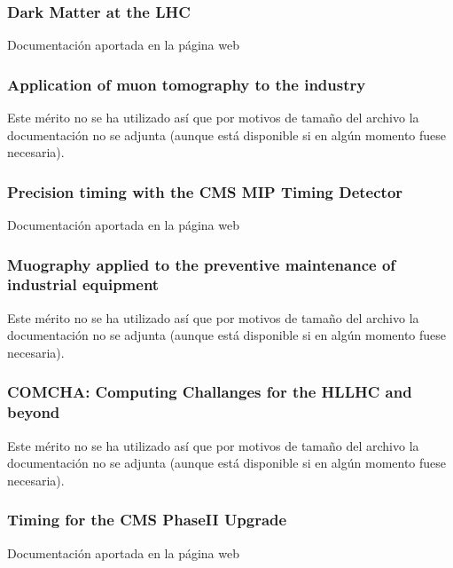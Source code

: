 \documentclass[a4paper, 11pt, twoside, openright]{report}
\begin{document}
\subsubsection{Dark Matter at the LHC}
%
Documentación aportada en la página web

\subsubsection{Application of muon tomography to the industry}
%
Este mérito no se ha utilizado así que por motivos de tamaño del archivo la documentación no se adjunta (aunque está disponible si en algún momento fuese necesaria).


\subsubsection{Precision timing with the CMS MIP Timing Detector}
%
Documentación aportada en la página web

\subsubsection{Muography applied to the preventive maintenance of industrial equipment}
%
Este mérito no se ha utilizado así que por motivos de tamaño del archivo la documentación no se adjunta (aunque está disponible si en algún momento fuese necesaria).

\subsubsection{COMCHA: Computing Challanges for the HLLHC and beyond}
%
Este mérito no se ha utilizado así que por motivos de tamaño del archivo la documentación no se adjunta (aunque está disponible si en algún momento fuese necesaria).


\subsubsection{Timing for the CMS PhaseII Upgrade}
%
Documentación aportada en la página web
\end{document}
